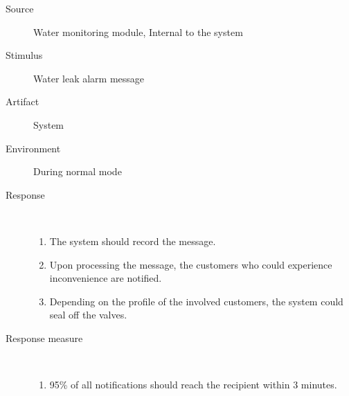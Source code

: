 \begin{description}
	\item[Source] Water monitoring module, Internal to the system
	\item[Stimulus] Water leak alarm message
	\item[Artifact] System
	\item[Environment] During normal mode
	\item[Response] \
		\begin{enumerate}
		  \item The system should record the message.
		  \item Upon processing the message, the customers who could experience
		  inconvenience are notified.
		  \item Depending on the profile of the involved customers, the system
		  could seal off the valves.
		\end{enumerate}
	\item[Response measure] \
	\begin{enumerate}
	  \item 95\% of all notifications should reach the recipient within 3 minutes.
	\end{enumerate} 
\end{description}